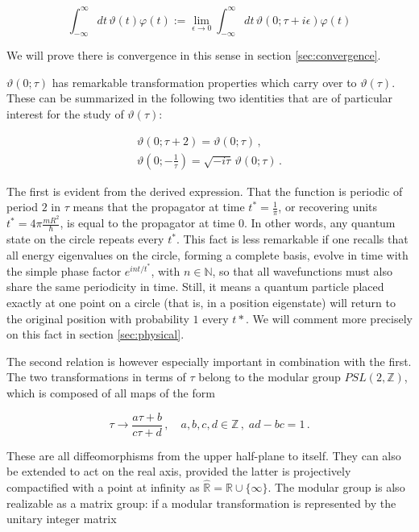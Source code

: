 \documentclass{article}
\newcommand{\T}{\ensuremath{\vartheta}}
\newcommand{\intR}{\int_{-\infty}^\infty}
\begin{document}
\begin{equation*}
    \intR dt \, \T(t) \varphi(t)  := \lim_{\epsilon\rightarrow 0} \intR dt \, \vartheta(0; \tau + i \epsilon) \varphi(t)
\end{equation*}

We will prove there is convergence in this sense in section \ref{sec:convergence}.

$\vartheta(0;\tau)$ has remarkable transformation properties which carry over to $\T(\tau)$. These can be summarized in the following two identities that are of particular interest for the study of $\T(\tau)$:

\begin{align}
    \vartheta(0; \tau + 2) = \vartheta(0; \tau)\,, \label{t2map}\\
    \vartheta(0; -\tfrac{1}{\tau}) = \sqrt{-i\tau} \, \vartheta(0; \tau)\,. \label{smap}
\end{align}

The first is evident from the derived expression. That the function is periodic of period $2$ in $\tau$ means that the propagator at time $t^* = \frac{1}{\pi}$, or recovering units $t^* = 4\pi \frac{mR^2}{\hbar}$, is equal to the propagator at time $0$. In other words, any quantum state on the circle repeats every $t^*$. This fact is less remarkable if one recalls that all energy eigenvalues on the circle, forming a complete basis, evolve in time with the simple phase factor $e^{int/t^*}$, with $n\in \mathbb{N}$, so that all wavefunctions must also share the same periodicity in time. Still, it means a quantum particle placed exactly at one point on a circle (that is, in a position eigenstate) will return to the original position with probability $1$ every $t*$. We will comment more precisely on this fact in section \ref{sec:physical}.

\newcommand{\modg}{PSL(2,\mathbb{Z})}

The second relation is however especially important in combination with the first. The two transformations in terms of $\tau$ belong to the modular group $\modg$, which is composed of all maps of the form

\begin{equation*}
    \tau \rightarrow \frac{a \tau + b}{c\tau + d}\,, \quad a,b,c,d \in \mathbb{Z}\,,\; ad - bc = 1\,.
\end{equation*}

These are all diffeomorphisms from the upper half-plane to itself. They can also be extended to act on the real axis, provided the latter is projectively compactified with a point at infinity as $\hat{\mathbb{R}} = \mathbb{R} \cup \{\infty\}$. The modular group is also realizable as a matrix group: if a modular transformation is represented by the unitary integer matrix
\end{document}
